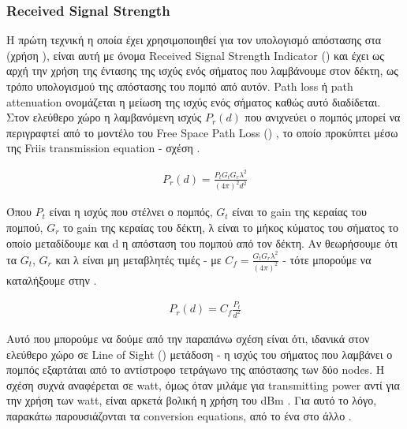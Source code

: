 \subsubsection{Received Signal Strength}
Η πρώτη τεχνική η οποία έχει χρησιμοποιηθεί για τον υπολογισμό απόστασης στα 
 (χρήση ), είναι αυτή με όνομα Received Signal Strength Indicator
() και έχει ως αρχή την χρήση της έντασης της ισχύς ενός 
σήματος που λαμβάνουμε στον δέκτη, ως τρόπο υπολογισμού της απόστασης
του πομπό από αυτόν. Path loss ή path attenuation \cite{wikipedia-Path_loss} ονομάζεται η μείωση της ισχύς
ενός σήματος καθώς αυτό διαδίδεται.
Στον ελεύθερο χώρο η λαμβανόμενη ισχύς $P_r(d)$ που ανιχνεύει ο πομπός
μπορεί να περιγραφτεί από το μοντέλο του Free Space Path Loss () \cite{wikipedia-fspl}, το οποίο προκύπτει
μέσω της Friis transmission equation \cite{wsn-Localization-techniques} \cite{rssi-wlan} \cite{wikipedia-friis-equation} - σχέση .

\begin{align}
	P_r(d)=\frac{P_tG_tG_r\lambda^2}{(4\pi)^2d^2} \label{eq:signal-strength}
\end{align}

Όπου $P_t$ είναι η ισχύς που στέλνει ο πομπός, $G_t$ είναι το gain της κεραίας του
πομπού, $G_r$ το gain της κεραίας του δέκτη, λ είναι το μήκος κύματος του σήματος
το οποίο μεταδίδουμε και d η απόσταση του πομπού από τον δέκτη. Αν θεωρήσουμε ότι 
τα $G_t$, $G_r$ και λ είναι μη μεταβλητές τιμές - με $C_f = \frac{G_tG_r\lambda^2}{(4\pi)^2}$ - τότε μπορούμε να καταλήξουμε
στην  \cite{rssi-simple-formula}.

\begin{align}
	P_r(d)=C_f\frac{P_t}{d^2} \label{eq:signal-strength-simple}
\end{align}

Αυτό που μπορούμε να δούμε από την παραπάνω σχέση είναι ότι, ιδανικά στον ελεύθερο 
χώρο σε Line of Sight () μετάδοση -
η ισχύς του σήματος που λαμβάνει ο πομπός εξαρτάται από το αντίστροφο τετράγωνο της
απόστασης των δύο nodes. Η σχέση  συχνά αναφέρεται σε watt, 
όμως όταν μιλάμε για transmitting power αντί για την χρήση των watt, είναι αρκετά βολική
η χρήση του dBm \cite{wikipedia-dBm}. Για αυτό το λόγο, παρακάτω παρουσιάζονται τα conversion
equations, από το ένα στο άλλο \cite{rssi-wlan} \cite{wikipedia-dBm}. 

